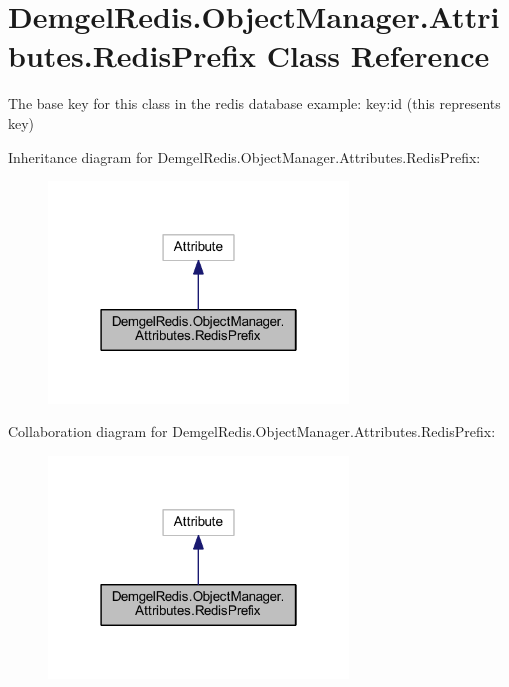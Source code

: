 \hypertarget{class_demgel_redis_1_1_object_manager_1_1_attributes_1_1_redis_prefix}{}\section{Demgel\+Redis.\+Object\+Manager.\+Attributes.\+Redis\+Prefix Class Reference}
\label{class_demgel_redis_1_1_object_manager_1_1_attributes_1_1_redis_prefix}


The base key for this class in the redis database example\+: key\+:id (this represents key)  




Inheritance diagram for Demgel\+Redis.\+Object\+Manager.\+Attributes.\+Redis\+Prefix\+:
\nopagebreak
\begin{figure}[H]
\begin{center}
\leavevmode
\includegraphics[width=226pt]{class_demgel_redis_1_1_object_manager_1_1_attributes_1_1_redis_prefix__inherit__graph}
\end{center}
\end{figure}


Collaboration diagram for Demgel\+Redis.\+Object\+Manager.\+Attributes.\+Redis\+Prefix\+:
\nopagebreak
\begin{figure}[H]
\begin{center}
\leavevmode
\includegraphics[width=226pt]{class_demgel_redis_1_1_object_manager_1_1_attributes_1_1_redis_prefix__coll__graph}
\end{center}
\end{figure}
